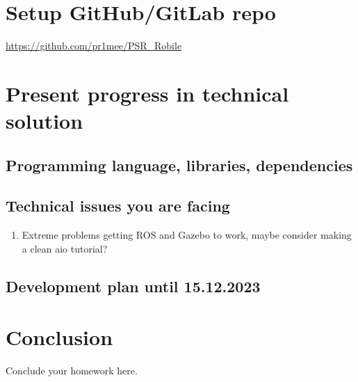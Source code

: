 \documentclass[11pt,a4paper]{article}
\begin{document}
\section{Setup GitHub/GitLab repo}
\url{https://github.com/pr1mee/PSR_Robile}

\section{Present progress in technical solution}

\subsection{Programming language, libraries, dependencies}
\subsection{Technical issues you are facing}
\begin {enumerate}
\item Extreme problems getting ROS and Gazebo to work, maybe consider making a clean aio tutorial?
\end{enumerate}
\subsection{Development plan until 15.12.2023}

\section{Conclusion}
Conclude your homework here.
% 
% 
\end{document}
